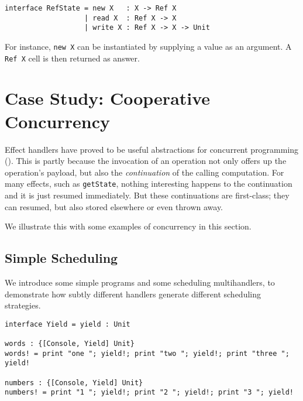 \documentclass[msc,deptreport,cs]{infthesis} %
\newcommand{\code}[1]{\lstinline{#1}}
\newcommand{\todo}[1]
           {{\par\noindent\small\color{RoyalPurple}
  \framebox{\parbox{\dimexpr\linewidth-2\fboxsep-2\fboxrule}
    {\textbf{TODO:} #1}}}}
\begin{document}
\begin{lstlisting}
interface RefState = new X   : X -> Ref X
                   | read X  : Ref X -> X
                   | write X : Ref X -> X -> Unit
\end{lstlisting}

\noindent For instance, \code{new X} can be instantiated by supplying a value as
an argument. A \code{Ref X} cell is then returned as answer.

\section{Case Study: Cooperative Concurrency}
\label{sec:concurrency}


Effect handlers have proved to be useful abstractions for concurrent programming
(\cite{dolan2015effective, dolan2017concurrent, hillerstrom2016compilation}).
This is partly because the invocation of an operation not only offers up the
operation's payload, but also the \emph{continuation} of the calling
computation. For many effects, such as \code{getState}, nothing interesting
happens to the continuation and it is just resumed immediately. But these
continuations are first-class; they can resumed, but also stored elsewhere or
even thrown away.

We illustrate this with some examples of concurrency in this section.

%

\subsection{Simple Scheduling}
\label{subsec:simple-scheduling}

We introduce some simple programs and some scheduling multihandlers, to
demonstrate how subtly different handlers generate different scheduling
strategies.

\begin{lstlisting}
interface Yield = yield : Unit

words : {[Console, Yield] Unit}
words! = print "one "; yield!; print "two "; yield!; print "three "; yield!

numbers : {[Console, Yield] Unit}
numbers! = print "1 "; yield!; print "2 "; yield!; print "3 "; yield!
\end{lstlisting}
\end{document}

